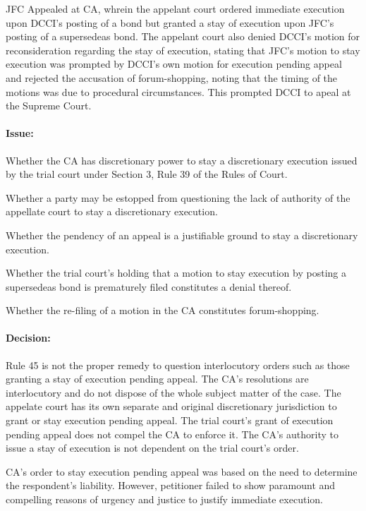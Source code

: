 \documentclass[
12pt,
oneside,
onehalfspacing,
headsepline
]{DigestCollection}
\begin{document}
JFC Appealed at CA, whrein the appelant court ordered immediate execution upon DCCI's posting of a bond but granted a stay of execution upon JFC's posting of a supersedeas bond. The appelant court also denied DCCI's motion for reconsideration regarding the stay of execution, stating that JFC's motion to stay execution was prompted by DCCI's own motion for execution pending appeal and rejected the accusation of forum-shopping, noting that the timing of the motions was due to procedural circumstances. This prompted DCCI to apeal at the Supreme Court.

\paragraph{Issue:}
\label{f74c84a0-1252-11ef-aa24-9916ea601717}


Whether the CA has discretionary power to stay a discretionary execution issued by the trial court under Section 3, Rule 39 of the Rules of Court.

Whether a party may be estopped from questioning the lack of authority of the appellate court to stay a discretionary execution.

Whether the pendency of an appeal is a justifiable ground to stay a discretionary execution.

Whether the trial court's holding that a motion to stay execution by posting a supersedeas bond is prematurely filed constitutes a denial thereof.

Whether the re-filing of a motion in the CA constitutes forum-shopping.

\paragraph{Decision:}
\label{f4ef5ac0-1252-11ef-aa24-9916ea601717}


Rule 45 is not the proper remedy to question interlocutory orders such as those granting a stay of execution pending appeal. The CA's resolutions are interlocutory and do not dispose of the whole subject matter of the case. The appelate court has its own separate and original discretionary jurisdiction to grant or stay execution pending appeal. The trial court's grant of execution pending appeal does not compel the CA to enforce it. The CA's authority to issue a stay of execution is not dependent on the trial court's order.

CA's order to stay execution pending appeal was based on the need to determine the respondent's liability. However, petitioner failed to show paramount and compelling reasons of urgency and justice to justify immediate execution.
\end{document}
